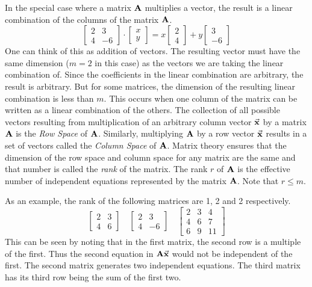In the special case where a matrix ${\textbf{A}}$ multiplies a vector,
the result is a linear combination of the columns of the matrix ${\textbf{A}}$.
\[
   \begin{bmatrix}
      2 & 3 \\ 4 & -6
   \end{bmatrix}
   \cdot
   \begin{bmatrix}
      x \\ y
   \end{bmatrix}
    =
   x
   \begin{bmatrix}
      2 \\ 4
   \end{bmatrix}
   +y
   \begin{bmatrix}
      3 \\ -6
   \end{bmatrix}
\]
One can think of this as addition of vectors.  The resulting vector must have the
same dimension ($m=2$ in this case) as the vectors we are taking the linear combination of.  
Since the coefficients in the linear combination are arbitrary, the result is arbitrary.
But for some matrices, the dimension of the resulting linear combination is less 
than $m$.  This occurs when one column of the matrix can be written as a linear combination
of the others.  The collection of all possible vectors resulting from multiplication
of an arbitrary column vector $\vec{\textbf{x}}$ by a matrix ${\textbf{A}}$ is the \emph{ Row Space} of ${\textbf{A}}$.
Similarly, multiplying ${\textbf{A}}$ by a row vector $\vec{\textbf{x}}$ results in a set of vectors
called the \emph{ Column Space} of ${\textbf{A}}$.  Matrix theory ensures that the dimension
of the row space and column space for any matrix are the same and that number is called
the \emph{ rank} of the matrix.  The rank $r$ of ${\textbf{A}}$ is the effective number of 
independent equations represented by the matrix ${\textbf{A}}$.  Note that $r\leq m$.

As an example, the rank of the following matrices are 1, 2 and 2 respectively.
\[
   \begin{bmatrix}
      2 & 3 \\ 4 & 6
   \end{bmatrix}
   \quad
   \begin{bmatrix}
      2 & 3 \\ 4 & -6
   \end{bmatrix}
   \quad
   \begin{bmatrix}
      2 & 3 & 4 \\ 4 & 6 & 7 \\ 6 & 9 & 11
   \end{bmatrix}
\]
This can be seen by noting that in the first matrix, the second row is a multiple of
the first.  Thus the second equation in ${\textbf{A}} \vec{\textbf{x}}$ would not be independent of the first.
The second matrix generates two independent equations. 
The third matrix has its third row being the sum of the first two.

